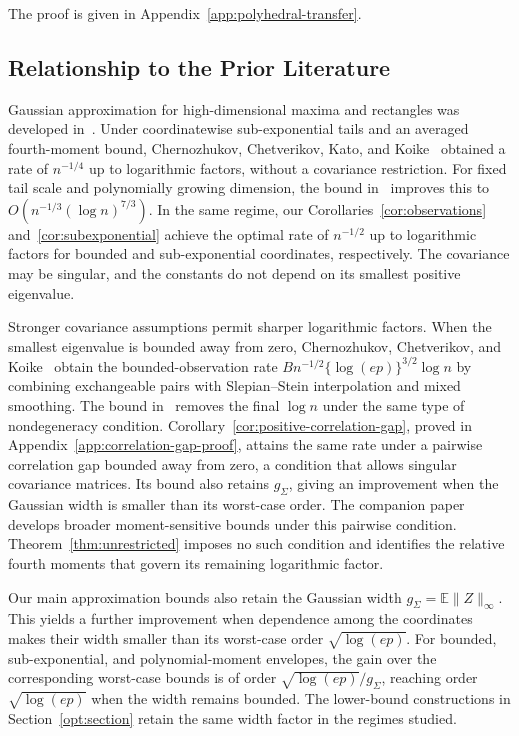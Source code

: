 \documentclass[11pt,letterpaper]{article}
\newenvironment{recovered}{}{}
\theoremstyle{remark}
\newcommand{\E}{\mathbb E}
\begin{document}
\begin{recovered}
The proof is given in Appendix~\ref{app:polyhedral-transfer}.
\end{recovered}


\subsection{Relationship to the Prior Literature}\label{sec:literature}

Gaussian approximation for high-dimensional maxima and rectangles was
developed in~\cite{CCK2013,CCK2017}. Under coordinatewise sub-exponential
tails and an averaged fourth-moment bound, Chernozhukov, Chetverikov,
Kato, and Koike~\cite[Theorem~2.1]{CCKK2022} obtained a rate of
\(n^{-1/4}\) up to logarithmic factors, without a covariance restriction.
For fixed tail scale and polynomially growing dimension, the bound
in~\cite[Theorem~1]{GaoZhang} improves this to
\(O(n^{-1/3}(\log n)^{7/3})\). In the same regime, our
Corollaries~\ref{cor:observations} and~\ref{cor:subexponential}
achieve the optimal rate of \(n^{-1/2}\) up to logarithmic factors
for bounded and sub-exponential coordinates, respectively.
The covariance may be singular, and the constants do not depend on
its smallest positive eigenvalue.

Stronger covariance assumptions permit sharper logarithmic factors.
When the smallest eigenvalue is bounded away from zero,
Chernozhukov, Chetverikov, and Koike~\cite{CCK} obtain the
bounded-observation rate \(Bn^{-1/2}\{\log(ep)\}^{3/2}\log n\)
by combining exchangeable pairs with Slepian--Stein interpolation
and mixed smoothing. The bound in~\cite{AL} removes the final
\(\log n\) under the same type of nondegeneracy condition.
Corollary~\ref{cor:positive-correlation-gap}, proved in
Appendix~\ref{app:correlation-gap-proof}, attains the same rate under a
pairwise correlation gap bounded away from zero, a condition that allows
singular covariance matrices. Its bound also retains $g_\Sigma$, giving
an improvement when the Gaussian width is smaller than its worst-case
order. The companion paper~\cite{CorrelationGap} develops broader
moment-sensitive bounds under this pairwise condition.
Theorem~\ref{thm:unrestricted} imposes no such condition and identifies
the relative fourth moments that govern its remaining logarithmic factor.

Our main approximation bounds also retain the Gaussian width
\(g_\Sigma=\E\|Z\|_\infty\). This yields a further improvement
when dependence among the coordinates makes their width smaller
than its worst-case order \(\sqrt{\log(ep)}\). For bounded,
sub-exponential, and polynomial-moment envelopes, the gain over
the corresponding worst-case bounds is of order
\(\sqrt{\log(ep)}/g_\Sigma\), reaching order
\(\sqrt{\log(ep)}\) when the width remains bounded.
The lower-bound constructions in Section~\ref{opt:section}
retain the same width factor in the regimes studied.
\end{document}
